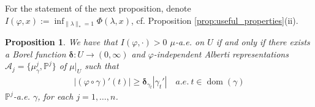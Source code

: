 \documentclass{amsart}
\newtheorem{proposition}[theorem]{Proposition}
\numberwithin{equation}{section}
\renewcommand{\P}{\mathbb{P}}
\newcommand{\dom}{\operatorname{dom}}
\begin{document}
For the statement of the next proposition, denote $\displaystyle I(\varphi,x):=\inf_{\|\lambda\|_\ast=1}\Phi(\lambda,x)$, cf. Proposition \ref{prop:useful_properties}(ii).

\begin{proposition}\label{prop:indep-vs-Alberti-rep}
We have that $I(\varphi,\cdot)>0$ $\mu$-a.e. on $U$ if and only if there exists a Borel function $\bm\delta:U\to (0,\infty)$ and $\varphi$-independent Alberti representations $\mathcal A_j=\{\mu_\gamma^j,\P^j\}$ of $\mu|_U$ such that
\begin{align} \label{eq:speed-lower-bd}
	|(\varphi\circ\gamma)'(t)|\ge \bm\delta_{\gamma_t}|\gamma_t'|\quad  a.e.\ t\in \dom(\gamma)
\end{align}
$\P^j$-a.e. $\gamma$, for each $j=1,\ldots,n$. 
\end{proposition}
\end{document}
